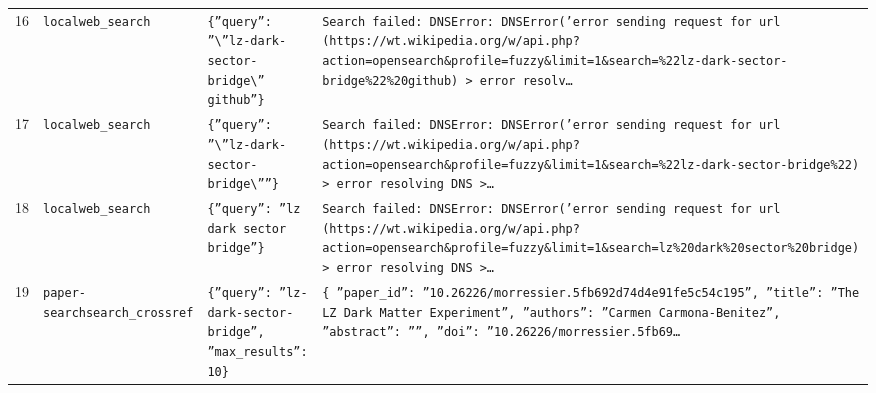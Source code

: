 \documentclass[11pt,a4paper]{article}
\begin{document}
\begin{longtable}{@{}p{}p{}p{}p{}@{}}
16 & \texttt{local}\newline\texttt{web\_\allowbreak{}search} & \texttt{\{''query'':\allowbreak{} ''\textbackslash{}\allowbreak{}''lz-dark-sector-bridge\textbackslash{}\allowbreak{}'' github''\}\allowbreak{}} & \texttt{Search failed:\allowbreak{} DNSError:\allowbreak{} DNSError('error sending request for url (https:\allowbreak{}/\allowbreak{}/\allowbreak{}wt.wikipedia.org/\allowbreak{}w/\allowbreak{}api.php?action=\allowbreak{}opensearch\&profile=\allowbreak{}fuzzy\&limit=\allowbreak{}1\&search=\allowbreak{}\%22lz-dark-sector-bridge\%22\%20github)\allowbreak{} \textgreater{}\allowbreak{} error resolv\ldots{}\allowbreak{}} \\
17 & \texttt{local}\newline\texttt{web\_\allowbreak{}search} & \texttt{\{''query'':\allowbreak{} ''\textbackslash{}\allowbreak{}''lz-dark-sector-bridge\textbackslash{}\allowbreak{}''''\}\allowbreak{}} & \texttt{Search failed:\allowbreak{} DNSError:\allowbreak{} DNSError('error sending request for url (https:\allowbreak{}/\allowbreak{}/\allowbreak{}wt.wikipedia.org/\allowbreak{}w/\allowbreak{}api.php?action=\allowbreak{}opensearch\&profile=\allowbreak{}fuzzy\&limit=\allowbreak{}1\&search=\allowbreak{}\%22lz-dark-sector-bridge\%22)\allowbreak{} \textgreater{}\allowbreak{} error resolving DNS \textgreater{}\allowbreak{}\ldots{}\allowbreak{}} \\
18 & \texttt{local}\newline\texttt{web\_\allowbreak{}search} & \texttt{\{''query'':\allowbreak{} ''lz dark sector bridge''\}\allowbreak{}} & \texttt{Search failed:\allowbreak{} DNSError:\allowbreak{} DNSError('error sending request for url (https:\allowbreak{}/\allowbreak{}/\allowbreak{}wt.wikipedia.org/\allowbreak{}w/\allowbreak{}api.php?action=\allowbreak{}opensearch\&profile=\allowbreak{}fuzzy\&limit=\allowbreak{}1\&search=\allowbreak{}lz\%20dark\%20sector\%20bridge)\allowbreak{} \textgreater{}\allowbreak{} error resolving DNS \textgreater{}\allowbreak{}\ldots{}\allowbreak{}} \\
19 & \texttt{paper-search}\newline\texttt{search\_\allowbreak{}crossref} & \texttt{\{''query'':\allowbreak{} ''lz-dark-sector-bridge'',\allowbreak{} ''max\_\allowbreak{}results'':\allowbreak{} 10\}\allowbreak{}} & \texttt{\{   ''paper\_\allowbreak{}id'':\allowbreak{} ''10.26226/\allowbreak{}morressier.5fb692d74d4e91fe5c54c195'',\allowbreak{}   ''title'':\allowbreak{} ''The LZ Dark Matter Experiment'',\allowbreak{}   ''authors'':\allowbreak{} ''Carmen Carmona-Benitez'',\allowbreak{}   ''abstract'':\allowbreak{} '''',\allowbreak{}   ''doi'':\allowbreak{} ''10.26226/\allowbreak{}morressier.5fb69\ldots{}\allowbreak{}} \\

\end{longtable}
\end{document}
